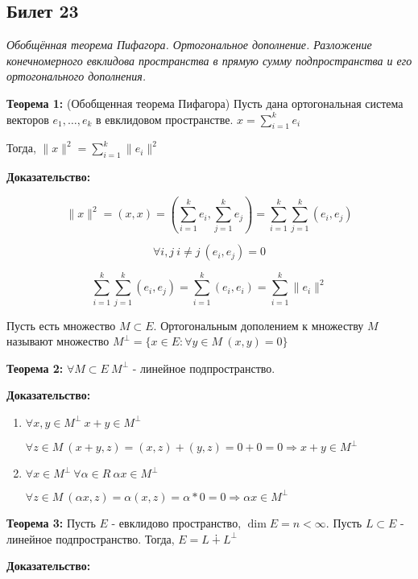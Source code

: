 \subsection{Билет 23}

\textit{Обобщённая теорема Пифагора. Ортогональное дополнение. Разложение конечномерного евклидова пространства в прямую сумму подпространства и его ортогонального дополнения.}

\textbf{Теорема 1:} (Обобщенная теорема Пифагора) Пусть дана ортогональная система векторов $e_1,\ldots,e_k$ в евклидовом пространстве. $x = \sum_{i=1}^k e_i$

Тогда, $\|x\|^2 = \sum_{i=1}^k \|e_i\|^2$

\textbf{Доказательство:}

$$
  \|x\|^2 = (x,x) = (\sum_{i=1}^k e_i,\sum_{j=1}^k e_j) = \sum_{i=1}^k \sum_{j=1}^k (e_i,e_j)
$$

$$
  \forall i,j ~ i\neq j ~ (e_i,e_j) = 0
$$

$$
 \sum_{i=1}^k \sum_{j=1}^k (e_i,e_j) = \sum_{i=1}^k (e_i,e_i) = \sum_{i=1}^k\|e_i\|^2
$$ 

Пусть есть множество $M \subset E$. Ортогональным дополением к множеству $M$ называют множество $M^\bot = \{x\in E: \forall y \in M ~ (x,y) = 0\}$

\textbf{Теорема 2:} $\forall M \subset E ~ M^\bot$ - линейное подпространство.

\textbf{Доказательство:}

\begin{enumerate}
 \item $\forall x,y \in M^\bot ~ x+y \in M^\bot$
      
       $\forall z \in M ~ (x+y,z) = (x,z)+(y,z) = 0+0 = 0 \Rightarrow x+y \in M^\bot$
 \item $\forall x \in M^\bot ~ \forall \alpha \in R ~ \alpha x \in M^\bot$
       
       $\forall z \in M ~ (\alpha x,z) = \alpha(x,z) = \alpha * 0 = 0 \Rightarrow \alpha x \in M^\bot$
\end{enumerate}

\textbf{Теорема 3:} Пусть $E$ - евклидово пространство, $\dim E = n < \infty$. Пусть $L \subset E$ - линейное подпространство. Тогда, $E = L \dotplus L^\bot$

\textbf{Доказательство: } 

